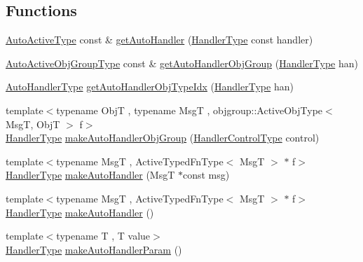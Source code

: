 \subsection*{Functions}
\begin{DoxyCompactItemize}
\item 
\hyperlink{namespacevt_1_1auto__registry_a2c91a60d4d3c0d80a563c3d4f54162eb}{Auto\+Active\+Type} const  \& \hyperlink{namespacevt_1_1auto__registry_a94926420bd6db07e6c1ae51ab0b06227}{get\+Auto\+Handler} (\hyperlink{namespacevt_af64846b57dfcaf104da3ef6967917573}{Handler\+Type} const handler)
\item 
\hyperlink{namespacevt_1_1auto__registry_a4b369568c19084c562ddbeef6894a145}{Auto\+Active\+Obj\+Group\+Type} const  \& \hyperlink{namespacevt_1_1auto__registry_afffd0c18d759d1903adcfd5703cf383c}{get\+Auto\+Handler\+Obj\+Group} (\hyperlink{namespacevt_af64846b57dfcaf104da3ef6967917573}{Handler\+Type} han)
\item 
\hyperlink{namespacevt_1_1auto__registry_ae295e18699146815bb7d7674594d95d7}{Auto\+Handler\+Type} \hyperlink{namespacevt_1_1auto__registry_a0c47caf1e4978208704029c0d0f925f0}{get\+Auto\+Handler\+Obj\+Type\+Idx} (\hyperlink{namespacevt_af64846b57dfcaf104da3ef6967917573}{Handler\+Type} han)
\item 
{\footnotesize template$<$typename ObjT , typename MsgT , objgroup\+::\+Active\+Obj\+Type$<$ Msg\+T, Obj\+T $>$ f$>$ }\\\hyperlink{namespacevt_af64846b57dfcaf104da3ef6967917573}{Handler\+Type} \hyperlink{namespacevt_1_1auto__registry_af096c71af57c441be5d6d5f9c1dd52fd}{make\+Auto\+Handler\+Obj\+Group} (\hyperlink{namespacevt_adbbef13b92f0a93b14c219b7cc8a48f2}{Handler\+Control\+Type} control)
\item 
{\footnotesize template$<$typename MsgT , Active\+Typed\+Fn\+Type$<$ Msg\+T $>$ $\ast$ f$>$ }\\\hyperlink{namespacevt_af64846b57dfcaf104da3ef6967917573}{Handler\+Type} \hyperlink{namespacevt_1_1auto__registry_abac49a5da9edd265913ca474a6624a09}{make\+Auto\+Handler} (MsgT $\ast$const msg)
\item 
{\footnotesize template$<$typename MsgT , Active\+Typed\+Fn\+Type$<$ Msg\+T $>$ $\ast$ f$>$ }\\\hyperlink{namespacevt_af64846b57dfcaf104da3ef6967917573}{Handler\+Type} \hyperlink{namespacevt_1_1auto__registry_a965b4801e4d0aee0e5b86342c92baf68}{make\+Auto\+Handler} ()
\item 
{\footnotesize template$<$typename T , T value$>$ }\\\hyperlink{namespacevt_af64846b57dfcaf104da3ef6967917573}{Handler\+Type} \hyperlink{namespacevt_1_1auto__registry_a5253f6bb76b4c7e98416fddd05c2695e}{make\+Auto\+Handler\+Param} ()

\end{DoxyCompactItemize}

